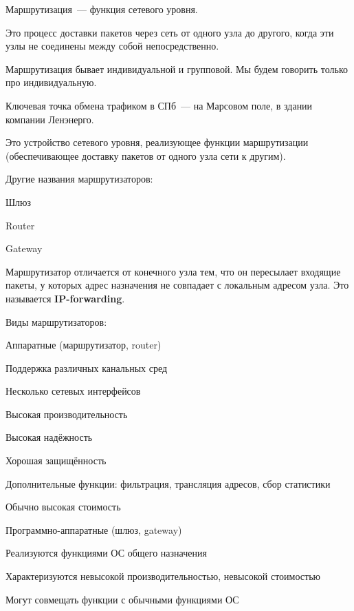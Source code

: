 
Маршрутизация~--- функция сетевого уровня.

Это процесс доставки пакетов через сеть от одного узла до другого, когда эти узлы не соединены между собой непосредственно.

Маршрутизация бывает индивидуальной и групповой. Мы будем говорить только про индивидуальную.

Ключевая точка обмена трафиком в СПб~--- на Марсовом поле, в здании компании Ленэнерго.


Это устройство сетевого уровня, реализующее функции маршрутизации (обеспечивающее доставку пакетов от одного узла сети к другим).

Другие названия маршрутизаторов:
\begin{MyItemize}
    \item Шлюз
    \item Router
    \item Gateway
\end{MyItemize}

Маршрутизатор отличается от конечного узла тем, что он пересылает входящие пакеты, у которых адрес назначения не совпадает с локальным адресом узла. Это называется {\bf IP-forwarding}.

Виды маршрутизаторов:
\begin{MyItemize}
    \item Аппаратные (маршрутизатор, router)
    \begin{MyItemize}
        \item Поддержка различных канальных сред
        \item Несколько сетевых интерфейсов
        \item Высокая производительность
        \item Высокая надёжность
        \item Хорошая защищённость
        \item Дополнительные функции: фильтрация, трансляция адресов, сбор статистики
        \item Обычно высокая стоимость
    \end{MyItemize}
    \item Программно-аппаратные (шлюз, gateway)
    \begin{MyItemize}
        \item Реализуются функциями ОС общего назначения
        \item Характеризуются невысокой производительностью, невысокой стоимостью
        \item Могут совмещать функции с обычными функциями ОС
    \end{MyItemize}
\end{MyItemize}

